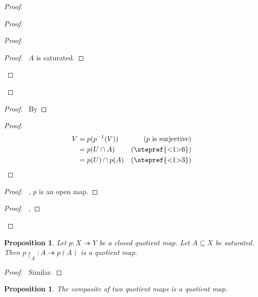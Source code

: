 \documentclass{report}
\let\qed\relax
\newtheorem{prop}[lm]{Proposition}
\theoremstyle{definition}
\begin{document}
\begin{proof}
\begin{proof}
      \begin{proof}
        \begin{proof}
          \pf\ $A$ is saturated.
        \end{proof}
      \end{proof}
    \end{proof}
    \begin{proof}
      \pf\ By 
    \end{proof}
    \begin{proof}
      \pf
      \begin{align*}
        V & = p(p^{-1}(V)) & (p \text{ is surjective}) \\
        & = p(U \cap A) & (\text{\stepref{<1>6}}) \\
        & = p(U) \cap p(A) & (\text{\stepref{<1>3}})
      \end{align*}
    \end{proof}
    \begin{proof}
      \pf\ , $p$ is an open map.
    \end{proof}
    \begin{proof}
      \pf\ , 
    \end{proof}
    \qed
  \end{proof}

  \begin{prop}
    Let $p : X \twoheadrightarrow Y$ be a closed quotient map. Let $A \subseteq
    X$ be
    saturated. Then $p \restriction_A : A \twoheadrightarrow p(A)$ is a
    quotient map.
  \end{prop}

  \begin{proof}
    \pf\ Similar. \qed
  \end{proof}

  \begin{prop}
    \label{prop:topology:quotient:composite}
    The composite of two quotient maps is a quotient map.
  \end{prop}
\end{document}
